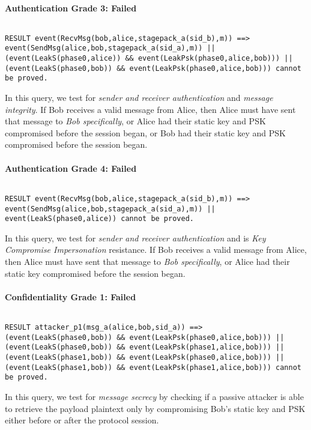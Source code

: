 \paragraph{Authentication Grade 3: Failed}$ $
\begin{lstlisting}
RESULT event(RecvMsg(bob,alice,stagepack_a(sid_b),m)) ==> event(SendMsg(alice,bob,stagepack_a(sid_a),m)) || (event(LeakS(phase0,alice)) && event(LeakPsk(phase0,alice,bob))) || (event(LeakS(phase0,bob)) && event(LeakPsk(phase0,alice,bob))) cannot be proved.
\end{lstlisting}

In this query, we test for \emph{sender and receiver authentication} and \emph{message integrity}. If Bob receives a valid message from Alice, then Alice must have sent that message to \emph{Bob specifically}, or Alice had their static key and PSK compromised before the session began, or Bob had their static key and PSK compromised before the session began.


\paragraph{Authentication Grade 4: Failed}$ $
\begin{lstlisting}
RESULT event(RecvMsg(bob,alice,stagepack_a(sid_b),m)) ==> event(SendMsg(alice,bob,stagepack_a(sid_a),m)) || event(LeakS(phase0,alice)) cannot be proved.
\end{lstlisting}

In this query, we test for \emph{sender and receiver authentication} and is \emph{Key Compromise Impersonation} resistance. If Bob receives a valid message from Alice, then Alice must have sent that message to \emph{Bob specifically}, or Alice had their static key compromised before the session began.


\paragraph{Confidentiality Grade 1: Failed}$ $
\begin{lstlisting}
RESULT attacker_p1(msg_a(alice,bob,sid_a)) ==> (event(LeakS(phase0,bob)) && event(LeakPsk(phase0,alice,bob))) || (event(LeakS(phase0,bob)) && event(LeakPsk(phase1,alice,bob))) || (event(LeakS(phase1,bob)) && event(LeakPsk(phase0,alice,bob))) || (event(LeakS(phase1,bob)) && event(LeakPsk(phase1,alice,bob))) cannot be proved.
\end{lstlisting}

In this query, we test for \emph{message secrecy} by checking if a passive attacker is able to retrieve the payload plaintext only by compromising Bob's static key and PSK either before or after the protocol session.


